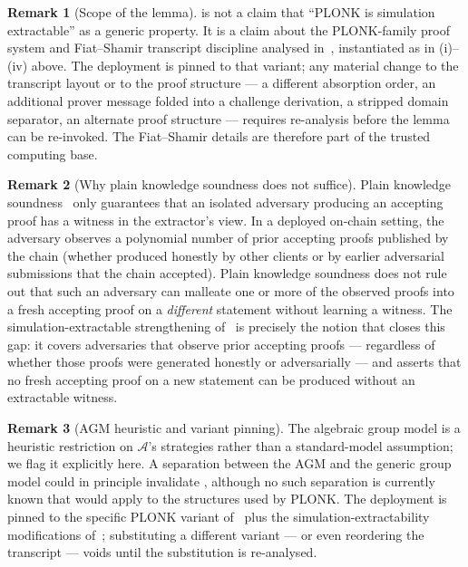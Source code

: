 \documentclass[11pt,a4paper]{article}
\theoremstyle{plain}
\theoremstyle{definition}
\newtheorem{remark}{Remark}
\newcommand{\Adv}{\mathcal{A}}
\begin{document}
\begin{remark}[Scope of the lemma]
\label{rem:se-scope}
 is not a claim that ``PLONK is simulation
extractable'' as a generic property. It is a claim about the
PLONK-family proof system and Fiat--Shamir transcript discipline
analysed in~\cite{ganesh-2022-simext-plonk}, instantiated as in
(i)--(iv) above. The deployment is pinned to that variant; any
material change to the transcript layout or to the proof
structure --- a different absorption order, an additional prover
message folded into a challenge derivation, a stripped domain
separator, an alternate proof structure --- requires re-analysis
before the lemma can be re-invoked. The Fiat--Shamir details are
therefore part of the trusted computing base.
\end{remark}

\begin{remark}[Why plain knowledge soundness does not suffice]
\label{rem:se-vs-ks}
Plain knowledge soundness~\cite{gabizon-2019-plonk} only
guarantees that an isolated adversary producing an accepting
proof has a witness in the extractor's view. In a deployed
on-chain setting, the adversary observes a polynomial number of
prior accepting proofs published by the chain (whether produced
honestly by other clients or by earlier adversarial submissions
that the chain accepted). Plain knowledge soundness does not
rule out that such an adversary can malleate one or more of the
observed proofs into a fresh accepting proof on a \emph{different}
statement without learning a witness. The simulation-extractable
strengthening of~\cite{ganesh-2022-simext-plonk} is precisely the
notion that closes this gap: it covers adversaries that observe
prior accepting proofs --- regardless of whether those proofs
were generated honestly or adversarially --- and asserts that
no fresh accepting proof on a new statement can be produced
without an extractable witness.
\end{remark}

\begin{remark}[AGM heuristic and variant pinning]
\label{rem:agm}
The algebraic group model is a heuristic restriction on
$\Adv$'s strategies rather than a standard-model assumption; we
flag it explicitly here. A separation between the AGM and the
generic group model could in principle invalidate
, although no such separation is currently
known that would apply to the structures used by PLONK. The
deployment is pinned to the specific PLONK variant
of~\cite{gabizon-2019-plonk} plus the simulation-extractability
modifications of~\cite{ganesh-2022-simext-plonk}; substituting a
different variant --- or even reordering the transcript --- voids
 until the substitution is re-analysed.
\end{remark}
\end{document}
